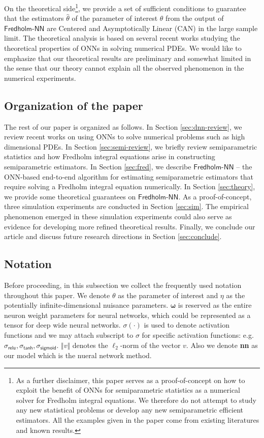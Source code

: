 \documentclass[11pt]{article}
\def\fred{\mathsf{Fredholm\mbox{-}NN}}
\def\relu{\mathsf{relu}}
\def\tanh{\mathsf{tanh}}
\def\sigmoid{\mathsf{sigmoid}}
\begin{document}
On the theoretical side\footnote{As a further disclaimer, this paper serves as a proof-of-concept on how to exploit the benefit of ONNs for semiparametric statistics as a numerical solver for Fredholm integral equations. We therefore do not attempt to study any new statistical problems or develop any new semiparametric efficient estimators. All the examples given in the paper come from existing literatures and known results.}, we provide a set of sufficient conditions to guarantee that the estimators $\hat{\theta}$ of the parameter of interest $\theta$ from the output of $\fred$ are Centered and Asymptotically Linear (CAN) in the large sample limit. The theoretical analysis is based on several recent works \citep{ma2018priori, e2020machine, e2021barron, luo2020two, lu2021prioria, lu2021priorib, chen2021representation} studying the theoretical properties of ONNs in solving numerical PDEs. We would like to emphasize that our theoretical results are preliminary and somewhat limited in the sense that our theory cannot explain all the observed phenomenon in the numerical experiments.

\subsection*{Organization of the paper}
The rest of our paper is organized as follows. In Section \ref{sec:dnn-review}, we review recent works on using ONNs to solve numerical problems such as high dimensional PDEs. In Section \ref{sec:semi-review}, we briefly review semiparametric statistics and how Fredholm integral equations arise in constructing semiparametric estimators. In Section \ref{sec:fred}, we describe $\fred$ -- the ONN-based end-to-end algorithm for estimating semiparametric estimators that require solving a Fredholm integral equation numerically. In Section \ref{sec:theory}, we provide some theoretical guarantees on $\fred$. As a proof-of-concept, three simulation experiments are conducted in Section \ref{sec:sim}. The empirical phenomenon emerged in these simulation experiments could also serve as evidence for developing more refined theoretical results. Finally, we conclude our article and discuss future research directions in Section \ref{sec:conclude}.

\subsection*{Notation}
Before proceeding, in this subsection we collect the frequently used notation throughout this paper. We denote $\theta$ as the parameter of interest and $\eta$ as the potentially infinite-dimensional nuisance parameters. $\bm{\omega}$ is reserved as the entire neuron weight parameters for neural networks, which could be represented as a tensor for deep wide neural networks. $\sigma (\cdot)$ is used to denote activation functions and we may attach subscript to $\sigma$ for specific activation functions: e.g. $\sigma_{\relu}, \sigma_{\tanh}, \sigma_{\sigmoid}$. $\Vert v \Vert$ denotes the $\ell_{2}$-norm of the vector $v$. Also we denote \textbf{nn} as our model which is the nueral network method.
\end{document}

